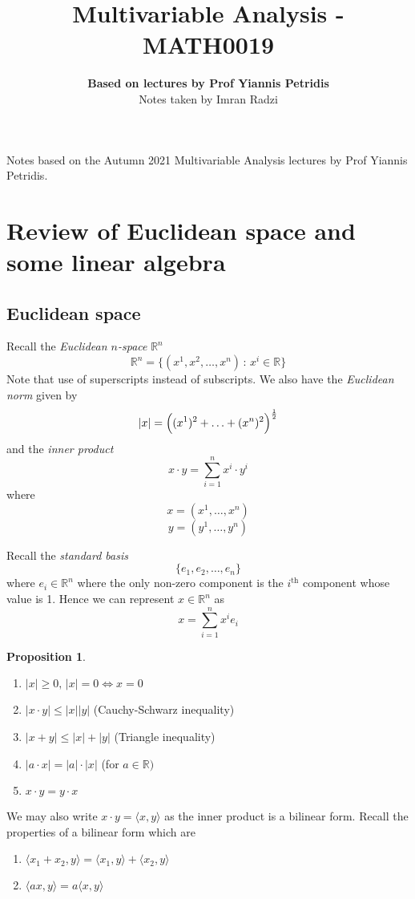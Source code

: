 \documentclass[a4paper,14pt]{extarticle}
\theoremstyle{definition}
\newtheorem*{proposition}{Proposition}
\begin{document}
\title{\textbf{Multivariable Analysis - MATH0019}}
\author{\textbf{Based on lectures by Prof Yiannis Petridis}\\ Notes taken by Imran Radzi}
\date{}
\maketitle

Notes based on the Autumn 2021 Multivariable Analysis lectures by Prof Yiannis Petridis.

\begingroup
\let\cleardoublepage\clearpage
\tableofcontents
\endgroup
\newpage
{}

\section{Review of Euclidean space and some linear algebra}
\subsection{Euclidean space}
Recall the \emph{Euclidean $n$-space} $\mathbb{R}^n$ \[\mathbb{R}^n=\{(x^1,x^2,\ldots,x^n)\,:\,x^i\in\mathbb{R}\}\]
Note that use of superscripts instead of subscripts. We also have the \emph{Euclidean norm} given by \[|x|=\Bigl((x^1)^2+\ldots+(x^n)^2\Bigr)^{\frac{1}{2}}\]
and the \emph{inner product} \[x\cdot y=\sum_{i=1}^n x^i\cdot y^i\] where \[x=(x^1,\ldots,x^n)\] \[y=(y^1,\ldots,y^n)\]

\noindent Recall the \emph{standard basis} \[\{e_1,e_2,\ldots,e_n\}\] where $e_i\in\mathbb{R}^n$ where the only non-zero component is the $i^{\text{th}}$ component whose value is 1.
Hence we can represent $x\in\mathbb{R}^n$ as \[x=\sum_{i=1}^n x^i e_i\]

\begin{proposition} \hfill
	\begin{enumerate}
		\item $|x|\geq0,\,|x|=0\iff x=0$
		\item $|x\cdot y|\leq|x||y|$ \hfill (Cauchy-Schwarz inequality)
		\item $|x+y|\leq|x|+|y|$ \hfill (Triangle inequality)
		\item $|a\cdot x|=|a|\cdot|x|$ \hfill (for $a\in\mathbb{R})$
		\item $x\cdot y=y\cdot x$
	\end{enumerate}
\end{proposition}

We may also write $x\cdot y=\langle x,y \rangle$ as the inner product is a bilinear form. Recall the properties of a bilinear form which are
\begin{enumerate}
	\item $\langle x_1+x_2,y\rangle=\langle x_1,y\rangle+\langle x_2,y\rangle$
	\item $\langle ax,y\rangle = a\langle x,y\rangle$
\end{enumerate}
\end{document}

